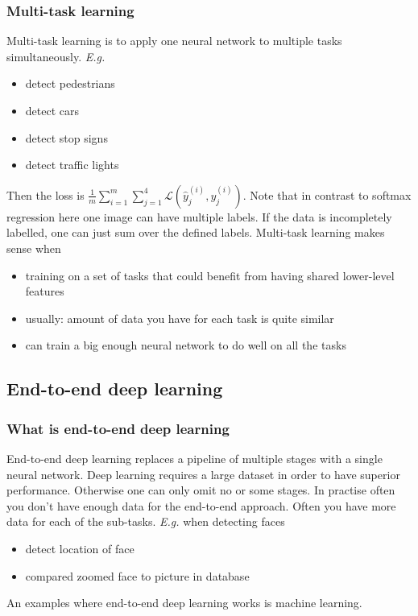 \documentclass{article}
\begin{document}
\subsubsection{Multi-task learning}
Multi-task learning is to apply one neural network to multiple tasks simultaneously.
\emph{E.g.}
\begin{itemize}
  \item detect pedestrians
  \item detect cars
  \item detect stop signs
  \item detect traffic lights
\end{itemize}
Then the loss is $\frac{1}{m}\sum_{i=1}^m\sum_{j=1}^4\mathcal{L}(\hat{y}^{(i)}_j,y^{(i)}_j)$.
Note that in contrast to softmax regression here one image can have multiple labels.
If the data is incompletely labelled, one can just sum over the defined labels.
Multi-task learning makes sense when
\begin{itemize}
  \item training on a set of tasks that could benefit from having shared lower-level features
  \item usually: amount of data you have for each task is quite similar
  \item can train a big enough neural network to do well on all the tasks
\end{itemize}

\subsection{End-to-end deep learning}
\subsubsection{What is end-to-end deep learning}
End-to-end deep learning replaces a pipeline of multiple stages with a single neural network.
Deep learning requires a large dataset in order to have superior performance.
Otherwise one can only omit no or some stages.
In practise often you don't have enough data for the end-to-end approach.
Often you have more data for each of the sub-tasks.
\emph{E.g.} when detecting faces
\begin{itemize}
  \item detect location of face
  \item compared zoomed face to picture in database
\end{itemize}
An examples where end-to-end deep learning works is machine learning.
\end{document}
